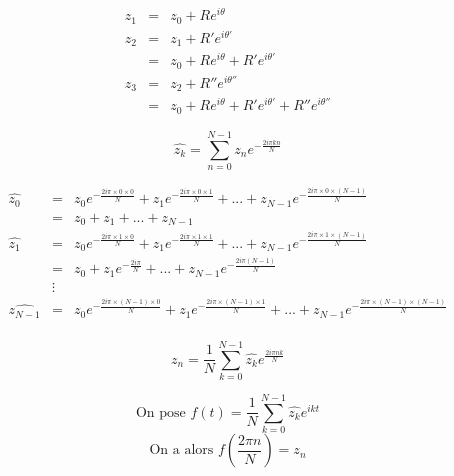 \documentclass[10pt,a2paper]{article}
\begin{document}
\newpage

\[
\begin{array}{rcl}
z_1 & = & z_0 + Re^{i\theta}\\
z_2 & = & z_1 + R' e^{i\theta'}\\
    & = & z_0 + Re^{i\theta} + R'e^{i\theta'}\\
z_3 & = & z_2 + R''e^{i\theta''}\\
	& = & z_0 + Re^{i\theta} + R'e^{i\theta'} + R''e^{i\theta''}
\end{array}
\]

\vspace{3em}

\[ \widehat{z_k}=\sum_{n=0}^{N-1} z_n e^{-\frac{2i\pi kn}{N}}\]
\vspace{3em}

{\setlength{\jot}{10pt}
\begin{eqnarray*}
\widehat{z_0} & = & z_0 e^{-\frac{2i\pi\times 0 \times 0}N} + z_1 e^{-\frac{2i\pi\times 0 \times 1}N} + ... + z_{N-1} e^{-\frac{2i\pi\times 0 \times (N-1)}N} \\
 &=& z_0 + z_1+ ... + z_{N-1} \\
\widehat{z_1} & = & z_0 e^{-\frac{2i\pi\times 1 \times 0}N} + z_1 e^{-\frac{2i\pi\times 1 \times 1}N} + ... + z_{N-1} e^{-\frac{2i\pi\times 1 \times (N-1)}N} \\
 & = & z_0 + z_1e^{-\frac{2i\pi}N} + ... + z_{N-1} e^{-\frac{2i\pi(N-1)}N}\\
 & \vdots & \\
\widehat{z_{N-1}} & = & z_0 e^{-\frac{2i\pi\times (N-1) \times 0}N} + z_1 e^{-\frac{2i\pi\times (N-1) \times 1}N} + ... + z_{N-1} e^{-\frac{2i\pi\times (N-1) \times (N-1)}N} \\
\end{eqnarray*}}

\vspace{2em}

\[ z_n=\dfrac 1 N\sum_{k=0}^{N-1} \widehat{z_k} e^{\frac{2i\pi nk}{N}}\]

\vspace{2em}
\[\textrm{On pose  }f(t)=\dfrac 1 N\sum_{k=0}^{N-1} \widehat{z_k} e^{ikt}\]
\vspace{2em}
\[\textrm{On a alors  }f\left(\dfrac{2\pi n}{N}\right)=z_n\]
\end{document}
